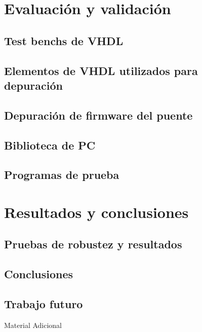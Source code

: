 \documentclass[11pt,a4paper]{beamer}
\begin{document}
	\section{Evaluación y validación}
		\subsection{Test benchs de VHDL}
			
		\subsection{Elementos de VHDL utilizados para depuración}
			
		\subsection{Depuración de firmware del puente}
			
		\subsection{Biblioteca de PC}
			
		\subsection{Programas de prueba}
			
	\section{Resultados y conclusiones}
		\subsection{Pruebas de robustez y resultados}
			
		\subsection{Conclusiones}
			
		\subsection{Trabajo futuro}
						
			\begin{frame}{Material Adicional}
			\end{frame}
			\scriptsize{
			}
\end{document}
